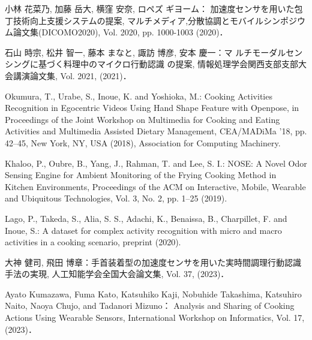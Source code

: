 \begin{thebibliography}{参考文献}
	小林 花菜乃, 加藤 岳大, 横窪 安奈, ロペズ ギヨーム：
	加速度センサを用いた包丁技術向上支援システムの提案, マルチメディア,分散協調とモバイルシンポジウム論文集(DICOMO2020), Vol. 2020, pp. 1000-1003 (2020)．
	
	石山 時宗, 松井 智一, 藤本 まなと, 諏訪 博彦, 安本 慶一：マ
	ルチモーダルセンシングに基づく料理中のマイクロ行動認識
	の提案, 情報処理学会関西支部支部大会講演論文集, Vol. 2021, (2021)．

	Okumura, T., Urabe, S., Inoue, K. and Yoshioka, M.: Cooking Activities Recognition in Egocentric Videos Using Hand Shape Feature with Openpose, in Proceedings of the Joint Workshop on Multimedia for Cooking and Eating Activities and Multimedia Assisted Dietary Management, CEA/MADiMa ’18, pp. 42–45, New York, NY, USA (2018), Association for Computing Machinery.

	Khaloo, P., Oubre, B., Yang, J., Rahman, T. and Lee, S. I.: NOSE: A Novel Odor Sensing Engine for Ambient Monitoring of the Frying Cooking Method in Kitchen Environments, Proceedings of the ACM on Interactive, Mobile, Wearable and Ubiquitous Technologies, Vol. 3, No. 2, pp. 1–25 (2019).

	Lago, P., Takeda, S., Alia, S. S., Adachi, K., Benaissa, B., Charpillet, F. and Inoue, S.: A dataset for complex activity recognition with micro and macro activities in a cooking scenario, preprint (2020).

	大神 健司, 飛田 博章：手首装着型の加速度センサを用いた実時間調理行動認識手法の実現, 人工知能学会全国大会論文集, Vol. 37, (2023)．

	Ayato Kumazawa, Fuma Kato, Katsuhiko Kaji, Nobuhide Takashima, Katsuhiro Naito, Naoya Chujo, and Tadanori Mizuno：
	Analysis and Sharing of Cooking Actions Using Wearable Sensors, International Workshop on Informatics, Vol. 17, (2023)．

\end{thebibliography}
